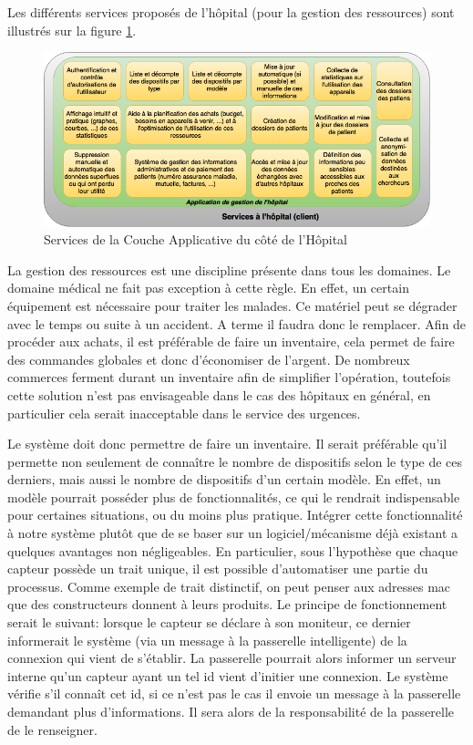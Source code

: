 Les différents services proposés de l'hôpital (pour la gestion des ressources) sont illustrés sur la figure \ref{hopital}.
\newline
\begin{figure}[h!]
	\hspace*{-2.5cm}
	\centering
	\includegraphics[width=1.4\textwidth]{hopital.png}
	\caption{Services de la Couche Applicative du côté de l'Hôpital}
	\label{hopital}
\end{figure}

La gestion des ressources est une discipline présente dans tous les domaines. Le domaine médical ne fait pas exception à cette
règle. En effet, un certain équipement est nécessaire pour traiter les malades. Ce matériel peut se dégrader avec le temps ou
suite à un accident. A terme il faudra donc le remplacer. Afin de procéder aux achats, il est préférable de faire un inventaire,
cela permet de faire des commandes globales et donc d'économiser de l'argent. De nombreux commerces ferment durant un inventaire
afin de simplifier l'opération, toutefois cette solution n'est pas envisageable dans le cas des hôpitaux en général, en
particulier cela serait inacceptable dans le service des urgences.  
\newline

Le système doit donc permettre de faire un inventaire. Il serait préférable qu'il permette non seulement de connaître le nombre de
dispositifs selon le type de ces derniers, mais aussi le nombre de dispositifs d'un certain modèle. En effet, un modèle pourrait
posséder plus de fonctionnalités, ce qui le rendrait indispensable pour certaines situations, ou du moins plus pratique. Intégrer
cette fonctionnalité à notre système plutôt que de se baser sur un logiciel/mécanisme déjà existant a quelques avantages non
négligeables. En particulier, sous l'hypothèse que chaque capteur possède un trait unique, il est possible d'automatiser une
partie du processus. Comme exemple de trait distinctif, on peut penser aux adresses mac que des constructeurs donnent à leurs
produits. Le principe de fonctionnement serait le suivant: lorsque le capteur se déclare à son moniteur, ce dernier informerait le
système (via un message à la passerelle intelligente) de la connexion qui vient de s'établir. La passerelle pourrait alors
informer un serveur interne qu'un capteur ayant un tel id vient d'initier une connexion. Le système vérifie s'il connaît cet id,
si ce n'est pas le cas il envoie un message à la passerelle demandant plus d'informations. Il sera alors de la responsabilité de la
passerelle de le renseigner.  
\newline

